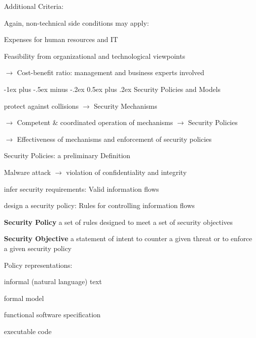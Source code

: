 \documentclass[a4paper]{article}
\makeatletter
\renewcommand{\note}[2]{\begin{noteBox} \textbf{#1} #2 \end{noteBox}}
\renewcommand{\section}{\@startsection{section}{1}{0mm}%
                {-1ex plus -.5ex minus -.2ex}%
                {0.5ex plus .2ex}%
                {\normalfont\large\bfseries}}
\makeatother
\begin{document}
\begin{multicols}{3}
    Additional Criteria:
    \begin{itemize*}
        \item Again, non-technical side conditions may apply:
        \begin{itemize*}
            \item Expenses for human resources and IT
            \item Feasibility from organizational and technological viewpoints
        \end{itemize*}
        \item[$\rightarrow$] Cost-benefit ratio: management and business experts involved
    \end{itemize*}

    \section{Security Policies and Models}
    \begin{itemize*}
        \item protect against collisions $\rightarrow$ Security Mechanisms
        \item[$\rightarrow$] Competent \& coordinated operation of mechanisms $\rightarrow$ Security Policies
        \item[$\rightarrow$] Effectiveness of mechanisms and enforcement of security policies
    \end{itemize*}

    Security Policies: a preliminary Definition
    \begin{itemize*}
        \item Malware attack $\rightarrow$ violation of confidentiality and integrity
        \item infer security requirements: Valid information flows
        \item design a security policy: Rules for controlling information flows
    \end{itemize*}

    \note{Security Policy}{a set of rules designed to meet a set of security objectives}

    \note{Security Objective}{a statement of intent to counter a given threat or to enforce a given security policy}

    Policy representations:
    \begin{itemize*}
        \item informal (natural language) text
        \item formal model
        \item functional software specification
        \item executable code
    \end{itemize*}


\end{multicols}
\end{document}
